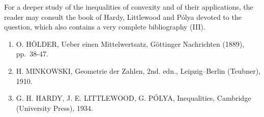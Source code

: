 For a deeper study of the inequalities of convexity and of their applications, the reader may consult the book of Hardy, Littlewood and Pólya devoted to the question, which also contains a very complete bibliography (III).

\begin{enumerate}
\def\labelenumi{(\Roman{enumi})}
\item
  O. HÖLDER, Ueber einen Mittelwertsatz, Göttinger Nachrichten (1889), pp.~38-47.
\item
  H. MINKOWSKI, Geometrie der Zahlen, 2nd. edn., Leipzig--Berlin (Teubner), 1910.
\item
  G. H. HARDY, J. E. LITTLEWOOD, G. PÓLYA, Inequalities, Cambridge (University Press), 1934.
\end{enumerate}

